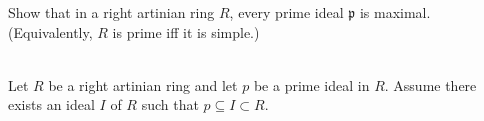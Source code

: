 Show that in a right artinian ring $R$, every prime ideal $\mathfrak{p}$ is maximal.
(Equivalently, $R$ is prime iff it is simple.)\\

\begin{solution}\renewcommand{\qedsymbol}{}\ \\
    Let $R$ be a right artinian ring and let $p$ be a prime ideal in $R$. Assume there exists an ideal
    $I$ of $R$ such that  $p\subseteq I\subset R$.

\end{solution}